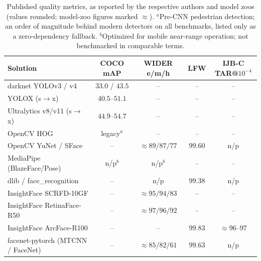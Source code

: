 \documentclass[11pt]{article}
\theoremstyle{definition}
\begin{document}
\begin{table}[ht]
\centering
\scriptsize
\setlength{\tabcolsep}{4pt}
\begin{tabular}{l c c c c}
\toprule
Solution & COCO mAP & WIDER e/m/h & LFW & IJB-C TAR@$10^{-4}$ \\
\midrule
darknet YOLOv3 / v4 & $33.0$ / $43.5$ & -- & -- & -- \\
YOLOX (s$\to$x) \cite{Ge2021} & $40.5$--$51.1$ & -- & -- & -- \\
Ultralytics v8/v11 (s$\to$x) & $44.9$--$54.7$ & -- & -- & -- \\
OpenCV HOG & legacy$^{a}$ & -- & -- & -- \\
OpenCV YuNet / SFace & -- & $\approx89/87/77$ & $99.60$ & n/p \\
MediaPipe (BlazeFace/Pose) & n/p$^{b}$ & n/p$^{b}$ & -- & -- \\
dlib / face\_recognition & -- & n/p & $99.38$ & n/p \\
InsightFace SCRFD-10GF \cite{Guo2021} & -- & $\approx95/94/83$ & -- & -- \\
InsightFace RetinaFace-R50 \cite{Deng2020} & -- & $\approx97/96/92$ & -- & -- \\
InsightFace ArcFace-R100 \cite{Deng2019} & -- & -- & $99.83$ & $\approx96$--$97$ \\
facenet-pytorch (MTCNN / FaceNet) & -- & $\approx85/82/61$ & $99.63$ & n/p \\
\bottomrule
\end{tabular}
\caption{Published quality metrics, as reported by the respective
authors and model zoos (values rounded; model-zoo figures marked
$\approx$). $^{a}$Pre-CNN pedestrian detection; an order of magnitude
behind modern detectors on all benchmarks, listed only as a
zero-dependency fallback. $^{b}$Optimized for mobile near-range
operation; not benchmarked in comparable terms.}
\label{tab:pluginquality}
\end{table}
\end{document}
